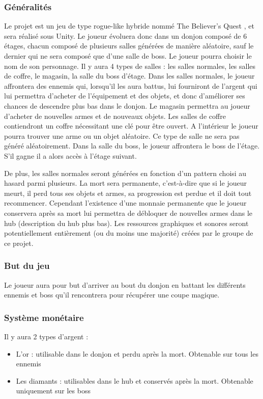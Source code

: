 \documentclass[]{extarticle}
\begin{document}
		\subsubsection{Généralités}
\bigbreak
\bigbreak
Le projet est un jeu de type rogue-like hybride nommé \og The Believer’s Quest \fg, et sera réalisé sous Unity. Le joueur évoluera donc dans un donjon composé de 6 étages, chacun composé de plusieurs salles générées de manière aléatoire, sauf le dernier qui ne sera composé que d’une salle de boss. Le joueur pourra choisir le nom de son personnage.
\bigbreak
Il y aura 4 types de salles : les salles normales, les salles de coffre, le magasin, la salle du boss d’étage. Dans les salles normales, le joueur affrontera des ennemis qui, lorsqu’il les aura battus, lui fourniront de l’argent qui lui permettra d’acheter de l’équipement et des objets, et donc d’améliorer ses chances de descendre plus bas dans le donjon. Le magasin permettra au joueur d’acheter de nouvelles armes et de nouveaux objets. Les salles de coffre contiendront un coffre nécessitant une clé pour être ouvert. A l’intérieur le joueur pourra trouver une arme ou un objet aléatoire. Ce type de salle ne sera pas généré aléatoirement. Dans la salle du boss, le joueur affrontera le boss de l’étage. S’il gagne il a alors accès à l’étage suivant.

De plus, les salles normales seront générées en fonction d'un pattern choisi au hasard parmi plusieurs.
\bigbreak
La mort sera permanente, c’est-à-dire que si le joueur meurt, il perd tous ses objets et armes, sa progression est perdue et il doit tout recommencer. Cependant l’existence d’une monnaie permanente que le joueur conservera après sa mort lui permettra de débloquer de nouvelles armes dans le hub (description du hub plus bas).
\bigbreak
Les ressources graphiques et sonores seront potentiellement entièrement (ou du moins une majorité) créées par le groupe de ce projet. 
\bigbreak

		\subsubsection{But du jeu}
\bigbreak
\bigbreak
Le joueur aura pour but d’arriver au bout du donjon en battant les différents ennemis et boss qu’il rencontrera pour récupérer une coupe magique.
\bigbreak

		\subsubsection{Système monétaire}
\bigbreak
\bigbreak
Il y aura 2 types d’argent :
\begin{itemize}
\item L’or : utilisable dans le donjon et perdu après la mort. Obtenable sur tous les ennemis
\item Les diamants : utilisables dans le hub et conservés après la mort. Obtenable uniquement sur les boss
\end{itemize}
\bigbreak
\newpage
\end{document}
